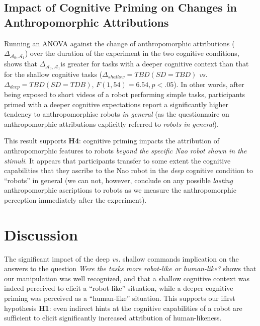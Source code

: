 \documentclass[lettersize, noapacite, twoside, HRI]{apa_HRI}
\newcommand{\vs}{\textit{vs.}\xspace}
\newcommand{\h}[1]{\textbf{H#1}\xspace}
\newcommand{\anti}{{$\mathcal{A}_0$\xspace}}
\newcommand{\antf}{{$\mathcal{A}_1$\xspace}}
\newcommand{\deltaant}{{ $\Delta_{\mathcal{A}_0,\mathcal{A}_1}$\xspace}}
\begin{document}
\subsection{Impact of Cognitive Priming on Changes in Anthropomorphic
Attributions}

Running an ANOVA against the change of anthropomorphic attributions
(\deltaant) over the duration of the experiment in the two cognitive
conditions, shows that \deltaant is greater for tasks with a deeper cognitive
context than that for the shallow cognitive tasks ($\Delta_{shallow}=TBD (SD=TBD)$
\vs $\Delta_{deep}=TBD (SD=TDB)$, $F(1,54) = 6.54, p < .05$). In other words, after being exposed to short videos of a robot
performing simple tasks, participants primed with a deeper cognitive
expectations report a significantly higher tendency to anthropomorphise robots
\emph{in general} (as the questionnaire on anthropomorphic attributions
explicitly referred to \emph{robots in general}).


This result supports \h{4}: cognitive priming impacts the
attribution of anthropomorphic features to robots \emph{beyond the specific Nao robot
shown in the stimuli}.  It appears that participants transfer to some extent the
cognitive capabilities that they ascribe to the Nao robot in the
\emph{deep} cognitive condition to ``robots'' in general (we can not, however,
conclude on any possible \emph{lasting} anthropomorphic ascriptions to robots as we
measure the anthropomorphic perception immediately after the experiment).


\section{Discussion}

The significant impact of the deep \vs shallow commands implication on the
answers to the question \emph{Were the tasks more robot-like or human-like?}
shows that our manipulation was well recognized, and that a shallow cognitive
context was indeed perceived to elicit a ``robot-like'' situation, while a deeper
cognitive priming was perceived as a ``human-like'' situation. This supports our
ifirst hypothesis \h{1}: even indirect hints at the cognitive capabilities of a robot are
sufficient to elicit significantly increased attribution of human-likeness.
\end{document}
